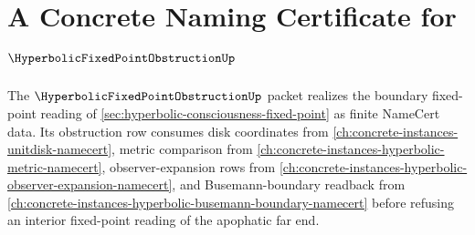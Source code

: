 \chapter{A Concrete Naming Certificate for $\HyperbolicFixedPointObstructionUp$}
\label{ch:concrete-instances-hyperbolic-fixed-point-obstruction-namecert}

The $\HyperbolicFixedPointObstructionUp$ packet realizes the boundary fixed-point reading of \autoref{sec:hyperbolic-consciousness-fixed-point} as finite NameCert data. Its obstruction row consumes disk coordinates from \autoref{ch:concrete-instances-unitdisk-namecert}, metric comparison from \autoref{ch:concrete-instances-hyperbolic-metric-namecert}, observer-expansion rows from \autoref{ch:concrete-instances-hyperbolic-observer-expansion-namecert}, and Busemann-boundary readback from \autoref{ch:concrete-instances-hyperbolic-busemann-boundary-namecert} before refusing an interior fixed-point reading of the apophatic far end.

